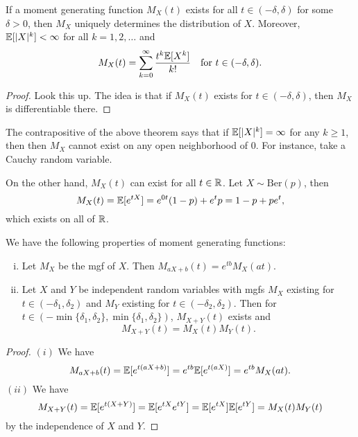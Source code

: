 \begin{theorem}
  If a moment generating function $M_X(t)$ exists
  for all $t \in (-\delta, \delta)$ for some
  $\delta > 0$, then $M_X$ uniquely determines
  the distribution of $X$. Moreover,
  $\mathbb{E}[|X|^k] < \infty$ for all $k = 1, 2, \dots$ and
  \[
    M_X(t) = \sum_{k = 0}^\infty \frac{t^k \mathbb{E}[X^k]}{k!}
    \quad \text{for $t \in (-\delta, \delta)$}.
  \]
\end{theorem}

\begin{proof}
  Look this up.
  The idea is that if
  $M_X(t)$ exists for $t \in (-\delta, \delta)$,
  then $M_X$ is differentiable there.
\end{proof}

\begin{example}
  The contrapositive of the above theorem says that
  if $\mathbb{E}[|X|^k] = \infty$ for any $k \ge 1$, then
  then $M_X$ cannot exist on any open neighborhood
  of $0$. For instance, take a Cauchy random
  variable.
\end{example}

\begin{example}
  On the other hand, $M_X(t)$ can exist for
  all $t \in \mathbb{R}$. Let $X \sim \mathrm{Ber}(p)$, then
  \[
    M_X(t) = \mathbb{E}[e^{tX}]
    = e^{0t} (1 - p) + e^t p
    = 1 - p + pe^t,
  \]
  which exists on all of $\mathbb{R}$.
\end{example}

\begin{prop}
  We have the following properties of moment
  generating functions:
  \begin{enumerate}[(i)]
    \item Let $M_X$ be the mgf of $X$. Then
      $M_{aX + b}(t) = e^{tb} M_X(at)$.
    \item Let $X$ and $Y$ be independent random
      variables with mgfs $M_X$ existing for
      $t \in (-\delta_1, \delta_2)$ and $M_Y$ existing
      for $t \in (-\delta_2, \delta_2)$. Then
      for $t \in (-{\min\{\delta_1, \delta_2\}}, \min\{\delta_1, \delta_2\})$,
      $M_{X + Y}(t)$ exists and
      \[
        M_{X + Y}(t) = M_X(t) M_Y(t).
      \]
  \end{enumerate}
\end{prop}

\begin{proof}
  $(i)$ We have
  \[
    M_{aX + b}(t)
    = \mathbb{E}[e^{t(aX + b)}]
    = e^{tb} \mathbb{E}[e^{t(aX)}]
    = e^{tb} M_X(at).
  \]
  $(ii)$ We have
  \[
    M_{X + Y}(t)
    = \mathbb{E}[e^{t(X + Y)}]
    = \mathbb{E}[e^{tX} e^{tY}]
    = \mathbb{E}[e^{tX}] \mathbb{E}[e^{tY}]
    = M_X(t) M_Y(t)
  \]
  by the independence of $X$ and $Y$.
\end{proof}

